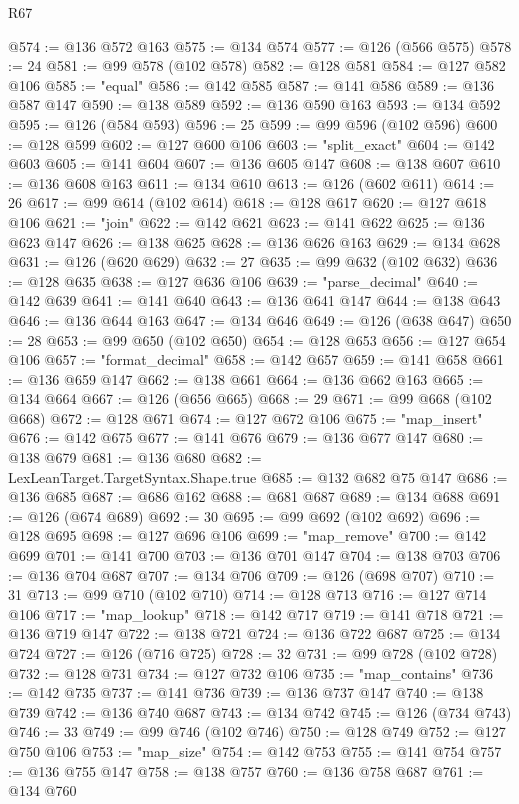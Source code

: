 \begin{lexlean}{R67}
\begin{coremodule}
@574 := @136 @572 @163
@575 := @134 @574
@577 := @126 (@566 @575)
@578 := 24
@581 := @99 @578 (@102 @578)
@582 := @128 @581
@584 := @127 @582 @106
@585 := "equal"
@586 := @142 @585
@587 := @141 @586
@589 := @136 @587 @147
@590 := @138 @589
@592 := @136 @590 @163
@593 := @134 @592
@595 := @126 (@584 @593)
@596 := 25
@599 := @99 @596 (@102 @596)
@600 := @128 @599
@602 := @127 @600 @106
@603 := "split_exact"
@604 := @142 @603
@605 := @141 @604
@607 := @136 @605 @147
@608 := @138 @607
@610 := @136 @608 @163
@611 := @134 @610
@613 := @126 (@602 @611)
@614 := 26
@617 := @99 @614 (@102 @614)
@618 := @128 @617
@620 := @127 @618 @106
@621 := "join"
@622 := @142 @621
@623 := @141 @622
@625 := @136 @623 @147
@626 := @138 @625
@628 := @136 @626 @163
@629 := @134 @628
@631 := @126 (@620 @629)
@632 := 27
@635 := @99 @632 (@102 @632)
@636 := @128 @635
@638 := @127 @636 @106
@639 := "parse_decimal"
@640 := @142 @639
@641 := @141 @640
@643 := @136 @641 @147
@644 := @138 @643
@646 := @136 @644 @163
@647 := @134 @646
@649 := @126 (@638 @647)
@650 := 28
@653 := @99 @650 (@102 @650)
@654 := @128 @653
@656 := @127 @654 @106
@657 := "format_decimal"
@658 := @142 @657
@659 := @141 @658
@661 := @136 @659 @147
@662 := @138 @661
@664 := @136 @662 @163
@665 := @134 @664
@667 := @126 (@656 @665)
@668 := 29
@671 := @99 @668 (@102 @668)
@672 := @128 @671
@674 := @127 @672 @106
@675 := "map_insert"
@676 := @142 @675
@677 := @141 @676
@679 := @136 @677 @147
@680 := @138 @679
@681 := @136 @680
@682 := LexLeanTarget.TargetSyntax.Shape.true
@685 := @132 @682 @75 @147
@686 := @136 @685
@687 := @686 @162
@688 := @681 @687
@689 := @134 @688
@691 := @126 (@674 @689)
@692 := 30
@695 := @99 @692 (@102 @692)
@696 := @128 @695
@698 := @127 @696 @106
@699 := "map_remove"
@700 := @142 @699
@701 := @141 @700
@703 := @136 @701 @147
@704 := @138 @703
@706 := @136 @704 @687
@707 := @134 @706
@709 := @126 (@698 @707)
@710 := 31
@713 := @99 @710 (@102 @710)
@714 := @128 @713
@716 := @127 @714 @106
@717 := "map_lookup"
@718 := @142 @717
@719 := @141 @718
@721 := @136 @719 @147
@722 := @138 @721
@724 := @136 @722 @687
@725 := @134 @724
@727 := @126 (@716 @725)
@728 := 32
@731 := @99 @728 (@102 @728)
@732 := @128 @731
@734 := @127 @732 @106
@735 := "map_contains"
@736 := @142 @735
@737 := @141 @736
@739 := @136 @737 @147
@740 := @138 @739
@742 := @136 @740 @687
@743 := @134 @742
@745 := @126 (@734 @743)
@746 := 33
@749 := @99 @746 (@102 @746)
@750 := @128 @749
@752 := @127 @750 @106
@753 := "map_size"
@754 := @142 @753
@755 := @141 @754
@757 := @136 @755 @147
@758 := @138 @757
@760 := @136 @758 @687
@761 := @134 @760

\end{coremodule}
\end{lexlean}
